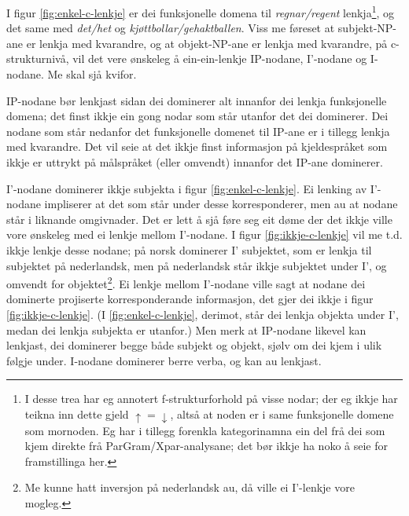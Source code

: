 \documentclass[12pt,a4paper,oneside,draft]{report}
\newcommand{\ua}{\ensuremath{\uparrow}}
\newcommand{\da}{\ensuremath{\downarrow}}
\begin{document}
I figur \ref{fig:enkel-c-lenkje} er dei funksjonelle domena til
 \emph{regnar/regent} lenkja\footnote{I desse trea har eg annotert f\hyp{}strukturforhold på visse nodar;
       der eg ikkje har teikna inn dette gjeld $\ua=\da$, altså at
       noden er i same funksjonelle domene som mornoden. Eg har i
       tillegg forenkla kategorinamna ein del frå dei som kjem direkte
       frå ParGram/Xpar-analysane; det bør ikkje ha noko å seie for
       framstillinga her. }, og det same med \emph{det/het} og
 \emph{kjøttbollar/gehaktballen}.  Viss me føreset at subjekt-NP-ane er
 lenkja med kvarandre, og at objekt-NP-ane er lenkja med kvarandre, på
 c\hyp{}strukturnivå, vil det vere ønskeleg å ein-ein-lenkje
 IP-nodane, I'-nodane og I-nodane. Me skal sjå kvifor.

IP-nodane bør lenkjast sidan dei dominerer alt innanfor dei
lenkja funksjonelle domena; det finst ikkje ein gong nodar som står
utanfor det dei dominerer. Dei nodane som står nedanfor det funksjonelle
domenet til IP-ane er i tillegg lenkja med kvarandre. Det vil seie at
det ikkje finst informasjon på kjeldespråket som ikkje er uttrykt på
målspråket (eller omvendt) innanfor det IP-ane dominerer.

I'-nodane dominerer ikkje subjekta i figur
 \ref{fig:enkel-c-lenkje}. Ei lenking av I'-nodane impliserer at det
 som står under desse korresponderer, men au at nodane står i liknande
 omgivnader. Det er lett å sjå føre seg eit døme der det ikkje ville
 vore ønskeleg med ei lenkje mellom I'-nodane. I figur
 \ref{fig:ikkje-c-lenkje} vil me t.d. ikkje lenkje desse nodane; på
 norsk dominerer I' subjektet, som er lenkja til subjektet på
 nederlandsk, men på nederlandsk står ikkje subjektet under I', og
 omvendt for objektet\footnote{Me kunne hatt inversjon på nederlandsk au, då ville ei
        I'-lenkje vore mogleg. }. Ei lenkje mellom I'-nodane ville sagt at
 nodane dei dominerte projiserte korresponderande informasjon, det
 gjer dei ikkje i figur \ref{fig:ikkje-c-lenkje}. (I
 \ref{fig:enkel-c-lenkje}, derimot, står dei lenkja objekta under I',
 medan dei lenkja subjekta er utanfor.) Men merk at IP-nodane likevel
 kan lenkjast, dei dominerer begge både subjekt og objekt, sjølv om
 dei kjem i ulik følgje under.  I-nodane dominerer berre verba, og kan
 au lenkjast.
\end{document}
